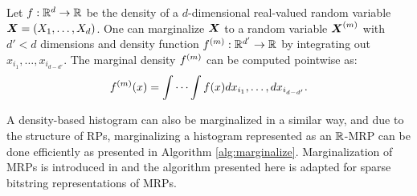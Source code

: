 \documentclass[../histograms.tex]{subfiles}
\begin{document}
  Let $f: \mathbb{R}^d \to \mathbb{R}$ be the density of a $d$-dimensional real-valued
  random variable $\X = (X_1, \dots, X_d)$.
  One can marginalize $\X$ to a random variable $\X \ind m$ with 
  $d' < d$ dimensions and density function
  $f ^{(m)} : \mathbb{R}^{d'} \to \mathbb{R}$
  by integrating out $x_{i_1}, \dots, x_{i_{d - d'}}$.
  The marginal density $f ^{(m)}$ can be computed pointwise as:
  \[ f ^{(m)} (x) = \idotsint f(x) dx_{i_1}, \dots, dx_{i_{d - d'}} .\]

  A density-based histogram can also be marginalized in a similar way,
  and due to the structure of RPs, marginalizing a histogram
  represented as an $\mathbb{R}$-MRP can be done efficiently as
  presented in Algorithm \ref{alg:marginalize}.
  Marginalization of MRPs is introduced in \cite{mrp-raaz-harlow-tucker} and 
  the algorithm presented here is adapted for 
  sparse bitstring representations of MRPs.
\end{document}
